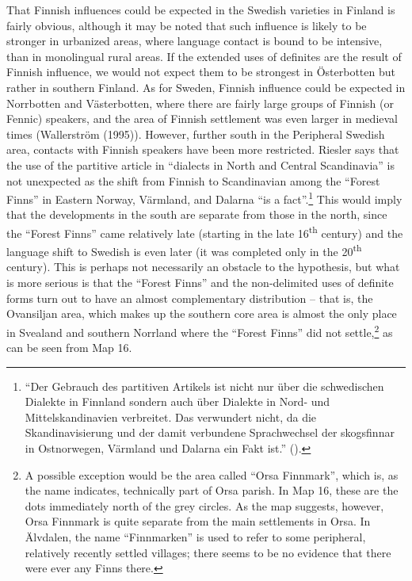 That Finnish influences could be expected in the Swedish varieties in Finland is fairly obvious, although it may be noted that such influence is likely to be stronger in urbanized areas, where language contact is bound to be intensive, than in monolingual rural areas. If the extended uses of definites are the result of Finnish influence, we would not expect them to be strongest in Österbotten but rather in southern Finland. As for Sweden, Finnish influence could be expected in Norrbotten and Västerbotten, where there are fairly large groups of Finnish (or Fennic) speakers, and the area of Finnish settlement was even larger in medieval times (Wallerström (1995)). However, further south in the Peripheral Swedish area, contacts with Finnish speakers have been more restricted. Riesler says that the use of the partitive article in “dialects in North and Central Scandinavia” is not unexpected as the shift from Finnish to Scandinavian among the “Forest Finns” in Eastern Norway, Värmland, and Dalarna “is a fact”.\footnote{ “Der Gebrauch des partitiven Artikels ist nicht nur über die schwedischen Dialekte in Finnland sondern auch über Dialekte in Nord- und Mittelskandinavien verbreitet. Das verwundert nicht, da die Skandinavisierung und der damit verbundene Sprachwechsel der skogsfinnar in Ostnorwegen, Värmland und Dalarna ein Fakt ist.” (\citet[57]{Riesler2002}). } This would imply that the developments in the south are separate from those in the north, since the “Forest Finns” came relatively late (starting in the late 16\textsuperscript{th }century) and the language shift to Swedish is even later (it was completed only in the 20\textsuperscript{th} century). This is perhaps not necessarily an obstacle to the hypothesis, but what is more serious is that the “Forest Finns” and the non-delimited uses of definite forms turn out to have an almost complementary distribution – that is, the Ovansiljan area, which makes up the southern core area is almost the only place in Svealand and southern Norrland where the “Forest Finns” did not settle,\footnote{ A possible exception would be the area called “Orsa Finnmark”, which is, as the name indicates, technically part of Orsa parish. In Map 16, these are the dots immediately north of the grey circles. As the map suggests, however, Orsa Finnmark is quite separate from the main settlements in Orsa. In Älvdalen, the name “Finnmarken” is used to refer to some peripheral, relatively recently settled villages; there seems to be no evidence that there were ever any Finns there. } as can be seen from Map 16.

